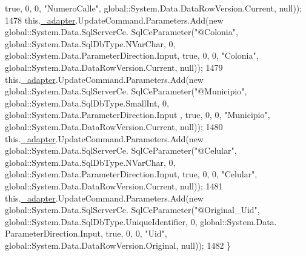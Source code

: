 \begin{DoxyCode}
{      true}, 0, 0, \textcolor{stringliteral}{"NumeroCalle"}, global::System.Data.DataRowVersion.Current, null));
1478             this.\hyperlink{class_proyecto___integrador__3_1_1ds_usuarios_table_adapters_1_1_usuarios_table_adapter_ab48b9b83ce2db01dbbc83ad45b428a80}{\_adapter}.UpdateCommand.Parameters.Add(\textcolor{keyword}{new} global::System.Data.SqlServerCe.
      SqlCeParameter(\textcolor{stringliteral}{"@Colonia"}, global::System.Data.SqlDbType.NVarChar, 0, global::System.Data.ParameterDirection.Input, \textcolor{keyword}{
      true}, 0, 0, \textcolor{stringliteral}{"Colonia"}, global::System.Data.DataRowVersion.Current, null));
1479             this.\hyperlink{class_proyecto___integrador__3_1_1ds_usuarios_table_adapters_1_1_usuarios_table_adapter_ab48b9b83ce2db01dbbc83ad45b428a80}{\_adapter}.UpdateCommand.Parameters.Add(\textcolor{keyword}{new} global::System.Data.SqlServerCe.
      SqlCeParameter(\textcolor{stringliteral}{"@Municipio"}, global::System.Data.SqlDbType.SmallInt, 0, global::System.Data.ParameterDirection.Input
      , \textcolor{keyword}{true}, 0, 0, \textcolor{stringliteral}{"Municipio"}, global::System.Data.DataRowVersion.Current, null));
1480             this.\hyperlink{class_proyecto___integrador__3_1_1ds_usuarios_table_adapters_1_1_usuarios_table_adapter_ab48b9b83ce2db01dbbc83ad45b428a80}{\_adapter}.UpdateCommand.Parameters.Add(\textcolor{keyword}{new} global::System.Data.SqlServerCe.
      SqlCeParameter(\textcolor{stringliteral}{"@Celular"}, global::System.Data.SqlDbType.NVarChar, 0, global::System.Data.ParameterDirection.Input, \textcolor{keyword}{
      true}, 0, 0, \textcolor{stringliteral}{"Celular"}, global::System.Data.DataRowVersion.Current, null));
1481             this.\hyperlink{class_proyecto___integrador__3_1_1ds_usuarios_table_adapters_1_1_usuarios_table_adapter_ab48b9b83ce2db01dbbc83ad45b428a80}{\_adapter}.UpdateCommand.Parameters.Add(\textcolor{keyword}{new} global::System.Data.SqlServerCe.
      SqlCeParameter(\textcolor{stringliteral}{"@Original\_Uid"}, global::System.Data.SqlDbType.UniqueIdentifier, 0, global::System.Data.
      ParameterDirection.Input, \textcolor{keyword}{true}, 0, 0, \textcolor{stringliteral}{"Uid"}, global::System.Data.DataRowVersion.Original, null));
1482         \}
\end{DoxyCode}

